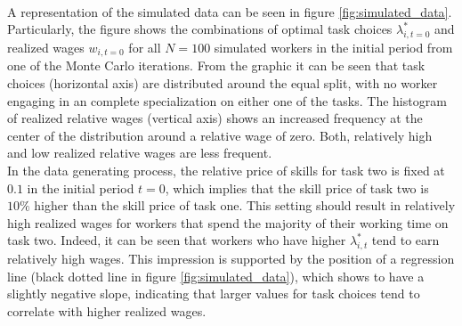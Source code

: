 \documentclass[../main.tex]{subfiles}
\begin{document}
\\
A representation of the simulated data can be seen in figure \ref{fig:simulated_data}. Particularly, the figure shows the combinations of optimal task choices $\lambda_{i,t=0}^*$ and realized wages $w_{i,t=0}$ for all $N=100$ simulated workers in the initial period from one of the Monte Carlo iterations. From the graphic it can be seen that task choices (horizontal axis) are distributed around the equal split, with no worker engaging in an complete specialization on either one of the tasks. The histogram of realized relative wages (vertical axis) shows an increased frequency at the center of the distribution around a relative wage of zero. Both, relatively high and low realized relative wages are less frequent.
\\
In the data generating process, the relative price of skills for task two is fixed at $0.1$ in the initial period $t=0$, which implies that the skill price of task two is $10 \%$ higher than the skill price of task one. This setting should result in relatively high realized wages for workers that spend the majority of their working time on task two. Indeed, it can be seen that workers who have higher $\lambda_{i,t}^*$ tend to earn relatively high wages. This impression is supported by the position of a regression line (black dotted line in figure \ref{fig:simulated_data}), which shows to have a slightly negative slope, indicating that larger values for task choices tend to correlate with higher realized wages.
\end{document}
